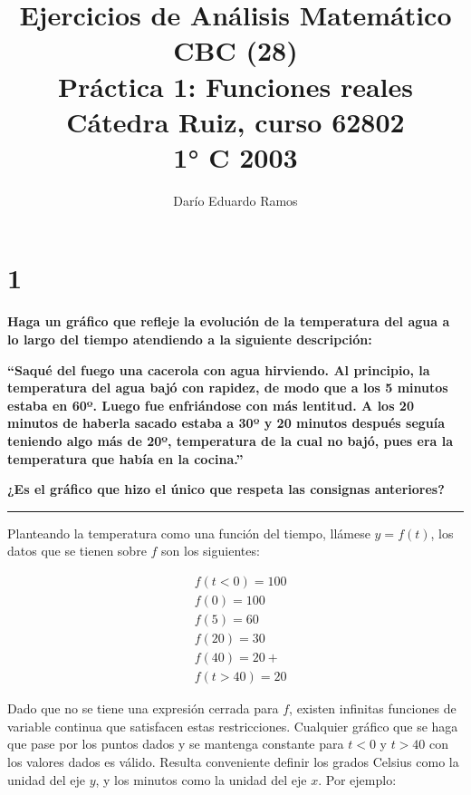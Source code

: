 \documentclass{article}
\title{Ejercicios de Análisis Matemático CBC (28) \\
Práctica 1: Funciones reales \\
Cátedra Ruiz, curso 62802 \\
1° C 2003}
\author{Darío Eduardo Ramos}
\newcommand{\sectionx}[1]{\section*{#1}\label{sec:#1}\addcontentsline{toc}{section}{\nameref{sec:#1}}}
\begin{document}
\maketitle

\tableofcontents{}

\newpage

\sectionx{1}

\textbf{Haga un gráfico que refleje la evolución de la temperatura del agua a lo largo del tiempo atendiendo a la siguiente descripción:}

\vspace{1em}

\textbf{``Saqué del fuego una cacerola con agua hirviendo. Al principio, la temperatura del agua bajó con rapidez, de modo que a los 5 minutos estaba en 60º. Luego fue enfriándose con más lentitud. A los 20 minutos de haberla sacado estaba a 30º y 20 minutos después seguía teniendo algo más de 20º, temperatura de la cual no bajó, pues era la temperatura que había en la cocina.'' }

\vspace{1em}

\textbf{¿Es el gráfico que hizo el único que respeta las consignas anteriores?}

\vspace{1em}

\hrule

\vspace{1em}

Planteando la temperatura como una función del tiempo, llámese $y = f(t)$, los datos que se tienen sobre $f$ son los siguientes:

\begin{subequations}
\begin{align}
& f(t < 0) = 100 \\
& f(0) = 100 \\
& f(5) = 60 \\
& f(20) = 30 \\
& f(40) = 20+ \\
& f(t > 40) = 20
\end{align}
\end{subequations}

Dado que no se tiene una expresión cerrada para $f$, existen infinitas funciones de variable continua que satisfacen estas restricciones. Cualquier gráfico que se haga que pase por los puntos dados y se mantenga constante para $t < 0$ y $t > 40$ con los valores dados es válido. Resulta conveniente definir los grados Celsius como la unidad del eje $y$, y los minutos como la unidad del eje $x$. Por ejemplo:
\end{document}
